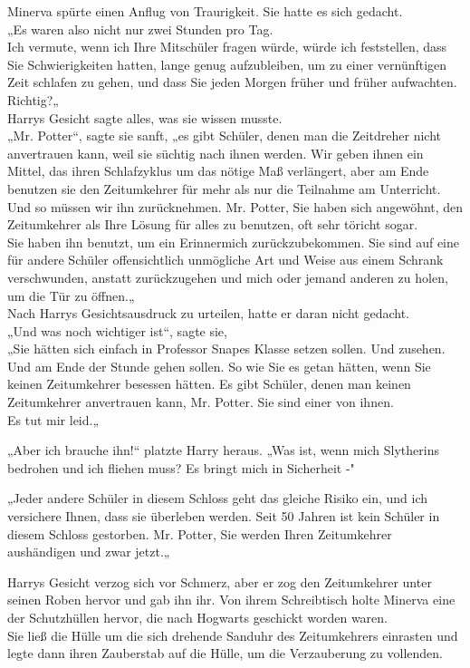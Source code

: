 {Minerva spürte einen Anflug von Traurigkeit. Sie hatte es sich gedacht.\\ „Es waren also nicht nur zwei Stunden pro Tag.\\ Ich vermute, wenn ich Ihre Mitschüler fragen würde, würde ich feststellen, dass Sie Schwierigkeiten hatten, lange genug aufzubleiben, um zu einer vernünftigen Zeit schlafen zu gehen, und dass Sie jeden Morgen früher und früher aufwachten. Richtig?„\\ Harrys Gesicht sagte alles, was sie wissen musste.\\ „Mr. Potter“, sagte sie sanft, „es gibt Schüler, denen man die Zeitdreher nicht anvertrauen kann, weil sie süchtig nach ihnen werden. Wir geben ihnen ein Mittel, das ihren Schlafzyklus um das nötige Maß verlängert, aber am Ende benutzen sie den Zeitumkehrer für mehr als nur die Teilnahme am Unterricht.\\ Und so müssen wir ihn zurücknehmen. Mr. Potter, Sie haben sich angewöhnt, den Zeitumkehrer als Ihre Lösung für alles zu benutzen, oft sehr töricht sogar.\\ Sie haben ihn benutzt, um ein Erinnermich zurückzubekommen. Sie sind auf eine für andere Schüler offensichtlich unmögliche Art und Weise aus einem Schrank verschwunden, anstatt zurückzugehen und mich oder jemand anderen zu holen, um die Tür zu öffnen.„\\ Nach Harrys Gesichtsausdruck zu urteilen, hatte er daran nicht gedacht.\\ „Und was noch wichtiger ist“, sagte sie,\\ „Sie hätten sich einfach in Professor Snapes Klasse setzen sollen. Und zusehen. Und am Ende der Stunde gehen sollen. So wie Sie es getan hätten, wenn Sie keinen Zeitumkehrer besessen hätten. Es gibt Schüler, denen man keinen Zeitumkehrer anvertrauen kann, Mr. Potter. Sie sind einer von ihnen.\\ Es tut mir leid.„

„Aber ich brauche ihn!“ platzte Harry heraus. „Was ist, wenn mich Slytherins bedrohen und ich fliehen muss? Es bringt mich in Sicherheit -"

„Jeder andere Schüler in diesem Schloss geht das gleiche Risiko ein, und ich versichere Ihnen, dass sie überleben werden. Seit 50 Jahren ist kein Schüler in diesem Schloss gestorben. Mr. Potter, Sie werden Ihren Zeitumkehrer aushändigen und zwar jetzt.„

Harrys Gesicht verzog sich vor Schmerz, aber er zog den Zeitumkehrer unter seinen Roben hervor und gab ihn ihr. Von ihrem Schreibtisch holte Minerva eine der Schutzhüllen hervor, die nach Hogwarts geschickt worden waren.\\ Sie ließ die Hülle um die sich drehende Sanduhr des Zeitumkehrers einrasten und legte dann ihren Zauberstab auf die Hülle, um die Verzauberung zu vollenden.

}
